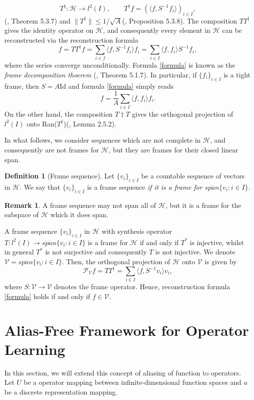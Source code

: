 \documentclass[reqno,10pt]{amsart}
\theoremstyle{plain}
\theoremstyle{definition}
\newtheorem{defn}{Definition}
\newtheorem{rem}{Remark}
\newcommand{\cal}[1]{\mathcal{#1}}
\begin{document}
    $$ T^\dag : \cal H \to l^2(I), \qquad T^\dag f = (\langle f, S^{-1}f_i\rangle)_{i\in I},$$
    (\cite{Christensen2008-gk}, Theorem 5.3.7) and $\|T^\dag\| \leq 1/\sqrt{A}$(\cite{Christensen2008-gk}, Proposition 5.3.8). The composition $TT^\dag$ gives the identity operator on $\cal H$, and consequently every element in $\cal H$ can be reconstructed via the reconstruction formula
    \begin{equation}\label{formula}
        f = TT^\dag f= \sum_{i\in f}\langle f,S^{-1}f_i\rangle f_i = \sum_{i\in I}\langle f,f_i\rangle S^{-1}f_i,
    \end{equation}
    where the series converge unconditionally. Formula \ref{formula} is known as the {\it frame decomposition thoerem} (\cite{Christensen2008-gk}, Theorem 5.1.7). In particular, if $\{f_i\}_{i\in I}$ is a tight frame, then $S = A\text{Id}$ and formula \ref{formula} simply reads
    $$ f = \frac{1}{A}\sum_{i\in I}\langle f,f_i\rangle f_i.$$
    On the other hand, the composition $T\dag T$ gives the orthogonal projection of $l^2(I)$ onto Ran($T^\dag$)(\cite{Christensen2008-gk}, Lemma 2.5.2).

    \noindent In what follows, we consider sequences which are not complete in $\cal H$, and consequently are not frames for $\cal H$, but they are frames for their closed linear span.
    \begin{defn}[Frame sequence]
        Let $\{v_i\}_{i\in I}$ be a countable sequence of vectors in $\cal H$. We say that $\{v_i\}_{i\in I}$ is a frame sequence {\it if it is a frame for $\overline{span}\{v_i:i\in I\}$.}
    \end{defn}
    \begin{rem}
        A frame sequence may not span all of $\cal H$, but it is a frame for the subspace of $\cal H$ which it does span.
    \end{rem}
    \noindent A frame sequence $\{v_i\}_{i\in I}$ in $\cal H$ with synthesis operator $T : l^2(I) \to \overline{span}\{v_i : i\in I\}$ is a frame for $\cal H$ if and only if $T^*$ is injective, whilst in general $T^*$ is not surjective and consequently $T$ is not injective. We denote $\cal V = \overline{span}\{v_i : i\in I\}$. Then, the orthogonal projection of $\cal H$ onto $\cal V$ is given by
    $$ \cal P_{\cal V}f = TT^\dag = \sum_{i\in I}\langle f,S^{-1}v_i\rangle v_i,$$
    where $S : \cal V \to \cal V$ denotes the frame operator. Hence, reconstruction formula \ref{formula} holds if and only if $f\in \cal V$.

    \section{\bf Alias-Free Framework for Operator Learning} \label{appendix:C}
    \noindent In this section, we will extend this concept of aliasing of function to operators. Let $U$ be a operator mapping between infinite-dimensional function spaces and $u$ be a discrete representation mapping.
    
\end{document}
